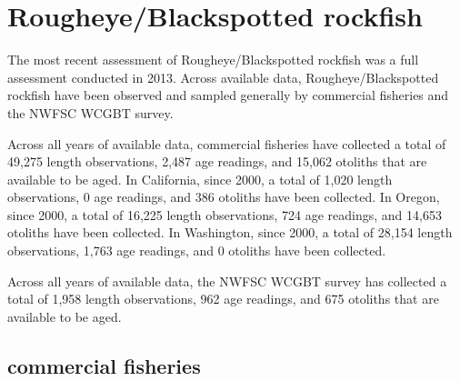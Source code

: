 \documentclass[11pt,
  english,
  letterpaper,
]{article}
\begin{document}

\hypertarget{rougheyeblackspotted-rockfish}{%
\section{Rougheye/Blackspotted rockfish}\label{rougheyeblackspotted-rockfish}}

\leavevmode\tagmcend\tagstructend


The most recent assessment of Rougheye/Blackspotted rockfish was a full assessment conducted in 2013. Across available data, Rougheye/Blackspotted rockfish have been observed and sampled generally by commercial fisheries and the NWFSC WCGBT survey.

\leavevmode\tagmcend\tagstructend\par


Across all years of available data, commercial fisheries have collected a total of 49,275 length observations, 2,487 age readings, and 15,062 otoliths that are available to be aged. In California, since 2000, a total of 1,020 length observations, 0 age readings, and 386 otoliths have been collected. In Oregon, since 2000, a total of 16,225 length observations, 724 age readings, and 14,653 otoliths have been collected. In Washington, since 2000, a total of 28,154 length observations, 1,763 age readings, and 0 otoliths have been collected.

\leavevmode\tagmcend\tagstructend\par


Across all years of available data, the NWFSC WCGBT survey has collected a total of 1,958 length observations, 962 age readings, and 675 otoliths that are available to be aged.

\leavevmode\tagmcend\tagstructend\par


\hypertarget{commercial-fisheries-43}{%
\subsection{commercial fisheries}\label{commercial-fisheries-43}}

\leavevmode\tagmcend\tagstructend
\end{document}
